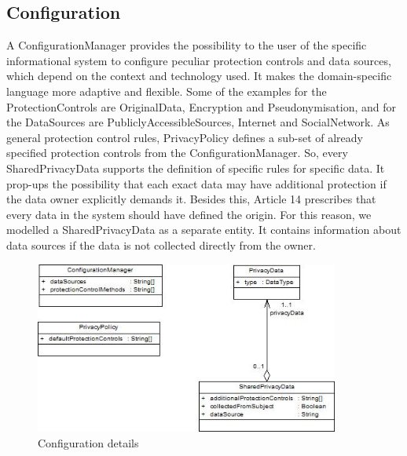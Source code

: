 \documentclass[11pt,english]{article}
\begin{document}
\subsection{Configuration}
A ConfigurationManager provides the possibility to the user of the specific informational system to configure peculiar protection controls and data sources, 
which depend on the context and technology used. It makes the domain-specific language more adaptive and flexible. Some of the examples for the ProtectionControls are OriginalData, Encryption and Pseudonymisation, and for the DataSources are PubliclyAccessibleSources, Internet and SocialNetwork. As general protection control rules, PrivacyPolicy defines a sub-set of already specified protection controls from the ConfigurationManager. So, every SharedPrivacyData supports the definition of specific rules for specific data. It prop-ups the possibility that each exact data may have additional protection if the data owner explicitly demands it. Besides this, Article 14 prescribes that every data in the system should have defined the origin. For this reason, we modelled a SharedPrivacyData as a separate entity. It contains information about data sources if the data is not collected directly from the owner.
\begin{figure}[H]
    \centering
    \includegraphics[width=10cm,scale=0.5]{images/configuration.jpg}
    \caption{Configuration details}
    \label{fig:configuration}
\end{figure}
\end{document}
